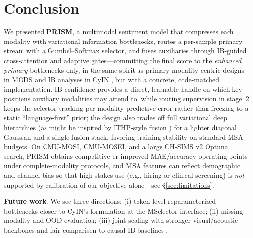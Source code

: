 \section{Conclusion}
\label{sec:conclusion}

We presented \textbf{PRISM}, a multimodal sentiment model that compresses
each modality with variational information bottlenecks, routes a per-sample
primary stream with a Gumbel--Softmax selector, and fuses auxiliaries through
IB-guided cross-attention and adaptive gates---committing the final score to
the \emph{enhanced primary} bottlenecks only, in the same spirit as
primary-modality-centric designs in MODS \citep{mods2026align} and IB analyses
in CyIN \citep{cyin2025align}, but with a concrete, code-matched
implementation.
IB confidence provides a direct, learnable handle on which key positions
auxiliary modalities may attend to, while routing supervision in stage~2 keeps
the selector tracking per-modality predictive error rather than freezing to a
static ``language-first'' prior; the design also trades off full variational
deep hierarchies (as might be inspired by ITHP-style fusion
\citep{ithp2024align}) for a lighter diagonal Gaussian and a single fusion
stack, favoring training stability on standard MSA budgets.
On CMU-MOSI, CMU-MOSEI, and a large CH-SIMS v2 Optuna search, PRISM obtains
competitive or improved MAE/accuracy operating points under complete-modality
protocols, and MSA features can reflect demographic and channel bias so that
high-stakes use (e.g., hiring or clinical screening) is \emph{not} supported
by calibration of our objective alone---see \S\ref{sec:limitations}.

\noindent \textbf{Future work}.
We see three directions: (i) token-level reparameterized bottlenecks closer to
CyIN's formulation \citep{cyin2025align} at the MSelector interface;
(ii) missing-modality and OOD evaluation;
(iii) joint scaling with stronger visual/acoustic backbones and fair comparison
to causal IB baselines \citep{jiang2025towards}.
